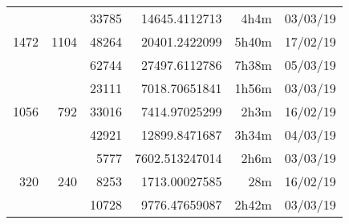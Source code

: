 \begin{center}
\begin{tabular}{ r r r | r r r }
  \hline
  \multirow{3}{*}{1472} & \multirow{3}{*}{1104} & 33785 & 14645.4112713 & 4h4m & 03/03/19 \\
  & & 48264 & 20401.2422099 & 5h40m & 17/02/19 \\
  & & 62744 & 27497.6112786 & 7h38m & 05/03/19 \\
  \hline
  \multirow{3}{*}{1056} & \multirow{3}{*}{792} & 23111 & 7018.70651841 & 1h56m & 03/03/19 \\
  & & 33016 & 7414.97025299 & 2h3m & 16/02/19 \\
  & & 42921 & 12899.8471687 & 3h34m & 04/03/19 \\
  \hline
  \multirow{3}{*}{320} & \multirow{3}{*}{240} & 5777 & 7602.513247014 & 2h6m & 03/03/19 \\
  & & 8253 & 1713.00027585 & 28m & 16/02/19 \\
  & & 10728 & 9776.47659087 & 2h42m & 03/03/19 \\
  \end{tabular}
  \end{center}

\newpage
